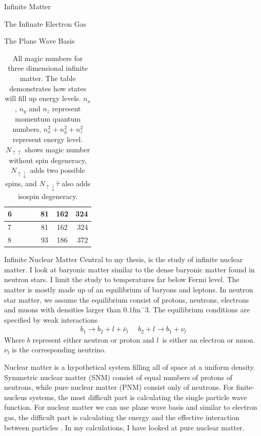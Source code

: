 \documentclass[twoside,english]{uiofysmaster}
\begin{document}
\begin{chapter}{Infinite Matter}
\begin{section}{The Infinate Electron Gas}
\begin{subsection}{The Plane Wave Basis}
\begin{table}[H]
\begin{center}
\begin{tabular}[center]{l | c c c | c | c | r }
						\hline
						6 &   &   &   & 81&162&324\\
						\hline
						7 &   &   &   & 81&162&324\\
						\hline
						8 &   &   &   & 93&186&372
					\end{tabular}
				\end{center}
				\caption{All magic numbers for three dimensional infinite matter. The table demonstrates how states will fill up energy levels. $n_x$, $n_y$ and $n_z$ represent momentum quantum numbers, $n_x^2 + n_y^2 + n_z^2$ represent energy level. $N_{\uparrow \uparrow}$ shows magic number without spin degeneracy, $N_{\uparrow \downarrow}$ adds two possible spins, and $N_{\uparrow \downarrow} \hat \tau $ also adds isospin degeneracy.} 
				\label{Magic Numbers 3d}
			\end{table}

		\end{subsection}

	\end{section}

	\begin{section}{Infinite Nuclear Matter}
		Central to my thesis, is the study of infinite nuclear matter. I look at baryonic matter similar to the dense baryonic matter found in neutron stars. I limit the study to temperatures far below Fermi level. The matter is mostly made up of an equilibrium of baryons and leptons. In neutron star matter, we assume the equilibrium consist of protons, neutrons, electrons and muons with densities larger than $0.1 \text{fm}^-3$. The equilibrium conditions are specified by weak interactions
		\begin{align}
		 	b_1 \rightarrow b_2 + l + \bar \nu_l \:\:\:\:\:\: b_2 + l \rightarrow b_1 + \nu_l
		\end{align} 
		Where $b$ represent either neutron or proton and $l$ is either an electron or muon. $\nu_l$ is the corresponding neutrino. 

		Nuclear matter is a hypothetical system filling all of space at a uniform density. Symmetric nuclear matter (SNM) consist of equal numbers of protons of neutrons, while pure nuclear matter (PNM) consist only of neutrons. For finite-nucleus systems, the most difficult part is calculating the single particle wave function. For nuclear matter we can use plane wave basis and similar to electron gas, the difficult part is calculating the energy and the effective interaction between particles \cite{Day1967}. In my calculations, I have looked at pure nuclear matter. 



\end{section}
\end{chapter}
\end{document}
